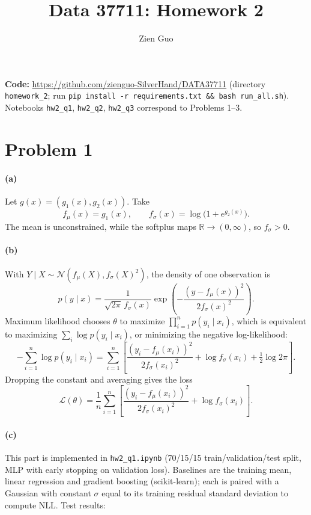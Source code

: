 \documentclass[11pt]{article}
\title{Data 37711: Homework 2}
\author{Zien Guo}
\date{}
\begin{document}
\maketitle

\noindent\textbf{Code:} \url{https://github.com/zienguo-SilverHand/DATA37711} (directory \texttt{homework\_2}; run \texttt{pip install -r requirements.txt \&\& bash run\_all.sh}). Notebooks \texttt{hw2\_q1}, \texttt{hw2\_q2}, \texttt{hw2\_q3} correspond to Problems 1--3.

\section*{Problem 1}

\paragraph{(a)}
Let $g(x)=(g_1(x),g_2(x))$. Take
\[
f_\mu(x)=g_1(x),\qquad f_\sigma(x)=\log\!\big(1+e^{g_2(x)}\big).
\]
The mean is unconstrained, while the softplus maps $\mathbb{R}\to(0,\infty)$, so $f_\sigma>0$.

\paragraph{(b)}
With $Y\mid X\sim\mathcal{N}(f_\mu(X),f_\sigma(X)^2)$, the density of one observation is
\[
p(y\mid x)=\frac{1}{\sqrt{2\pi}\,f_\sigma(x)}\exp\!\left(-\frac{(y-f_\mu(x))^2}{2f_\sigma(x)^2}\right).
\]
Maximum likelihood chooses $\theta$ to maximize $\prod_{i=1}^n p(y_i\mid x_i)$, which is equivalent to maximizing $\sum_i\log p(y_i\mid x_i)$, or minimizing the negative log-likelihood:
\[
-\sum_{i=1}^n\log p(y_i\mid x_i)=\sum_{i=1}^n\left[\frac{(y_i-f_\mu(x_i))^2}{2f_\sigma(x_i)^2}+\log f_\sigma(x_i)+\tfrac12\log 2\pi\right].
\]
Dropping the constant and averaging gives the loss
\[
\mathcal{L}(\theta)=\frac1n\sum_{i=1}^n\left[\frac{(y_i-f_\mu(x_i))^2}{2f_\sigma(x_i)^2}+\log f_\sigma(x_i)\right].
\]

\paragraph{(c)}
This part is implemented in \texttt{hw2\_q1.ipynb} (70/15/15 train/validation/test split, MLP with early stopping on validation loss). Baselines are the training mean, linear regression and gradient boosting (scikit-learn); each is paired with a Gaussian with constant $\sigma$ equal to its training residual standard deviation to compute NLL. Test results:
\end{document}
